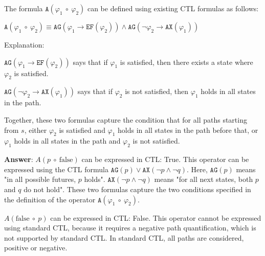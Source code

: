 \documentclass[11pt]{article}
\newcommand{\ax}[1]{\texttt{AX}(#1)}
\newcommand{\ag}[1]{\texttt{AG}(#1)}
\begin{document}
\begin{enumerate}
The formula $\texttt{A}(\varphi_1\ \circ\ \varphi_2)$ can be defined using existing CTL formulas as follows:

$\texttt{A}(\varphi_1\ \circ\ \varphi_2) \equiv \texttt{AG}(\varphi_1 \rightarrow \texttt{EF}(\varphi_2)) \land \texttt{AG}(\neg \varphi_2 \rightarrow \texttt{AX}(\varphi_1))$

Explanation:

$\texttt{AG}(\varphi_1 \rightarrow \texttt{EF}(\varphi_2))$ says that if $\varphi_1$ is satisfied, then there exists a state where $\varphi_2$ is satisfied.

$\texttt{AG}(\neg \varphi_2 \rightarrow \texttt{AX}(\varphi_1))$ says that if $\varphi_2$ is not satisfied, then $\varphi_1$ holds in all states in the path.

Together, these two formulas capture the condition that for all paths starting from $s$, either $\varphi_2$ is satisfied and $\varphi_1$ holds in all states in the path before that, or $\varphi_1$ holds in all states in the path and $\varphi_2$ is not satisfied.


\textbf{Answer}: $A(p\ \circ\ \mbox{false})$ can be expressed in CTL: True. This operator can be expressed using the CTL formula $\ag{p} \vee \ax{\neg p \land \neg q}$. Here, $\ag{p}$ means "in all possible futures, $p$ holds". $\ax{\neg p \land \neg q}$ means "for all next states, both $p$ and $q$ do not hold". These two formulas capture the two conditions specified in the definition of the operator $\texttt{A}(\varphi_1\ \circ\ \varphi_2)$.

$A(\mbox{false}\ \circ\ p)$ can be expressed in CTL: False. This operator cannot be expressed using standard CTL, because it requires a negative path quantification, which is not supported by standard CTL. In standard CTL, all paths are considered, positive or negative.

\end{enumerate}
\end{document}
